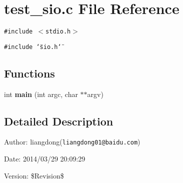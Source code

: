 \section{test\_\-sio.c File Reference}
\label{test__sio_8c}
{\tt \#include $<$stdio.h$>$}\par
{\tt \#include \char`\"{}sio.h\char`\"{}}\par
\subsection*{Functions}
\begin{CompactItemize}
\item 
int {\bf main} (int argc, char $\ast$$\ast$argv)\label{test__sio_8c_a2}

\end{CompactItemize}


\subsection{Detailed Description}
\begin{Desc}
\item[Author:]liangdong({\tt liangdong01@baidu.com}) \end{Desc}
\begin{Desc}
\item[Date:]2014/03/29 20:09:29 \end{Desc}
\begin{Desc}
\item[Version:]\$Revision\$ \end{Desc}
